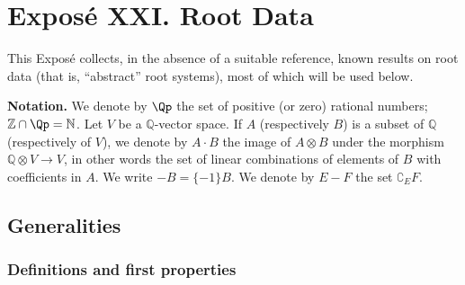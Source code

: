 \chapter*{Exposé XXI. Root Data}

\noindent
This Exposé
collects, in the absence of a suitable reference,
known results on root data (that is, ``abstract'' root systems), most of
which will be used below.

\medskip
\noindent\textbf{Notation.}
We denote by \(\Qp\) the set of positive (or zero) rational numbers;
\(\mathbb Z\cap\Qp=\mathbb N\). Let \(V\) be a \(\mathbb Q\)-vector
space. If \(A\) (respectively \(B\)) is a subset of \(\mathbb Q\)
(respectively of \(V\)), we denote by \(A\cdot B\) the image of
\(A\otimes B\) under the morphism
\(\mathbb Q\otimes V\to V\), in other words the set of linear
combinations of elements of \(B\) with coefficients in \(A\). We write
\(-B=\{-1\}B\). We denote by \(E-F\) the set \(\complement_EF\).

\section{Generalities}

\subsection{Definitions and first properties}

